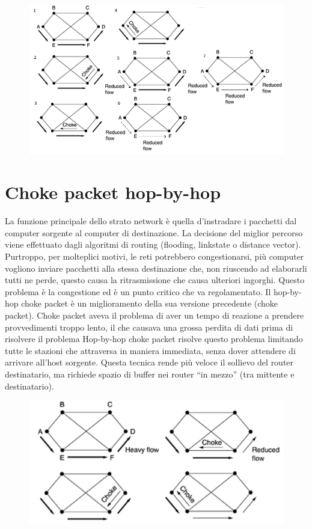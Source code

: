 \begin{figure}[H]
\centering
\includegraphics[scale=0.6]{res/img/35_ChokePacket.png}
\end{figure}

\section{Choke packet hop-by-hop}

La funzione principale dello strato network è quella d’instradare i pacchetti dal computer sorgente al computer di destinazione. La decisione del miglior percorso viene effettuato dagli algoritmi di routing (flooding, linkstate o distance vector). Purtroppo, per molteplici motivi, le reti potrebbero congestionarsi, più computer vogliono inviare pacchetti alla stessa destinazione che, non riuscendo ad elaborarli tutti ne perde, questo causa la ritrasmissione che causa ulteriori ingorghi. Questo problema è la congestione ed è un punto critico che va regolamentato.
Il hop-by-hop choke packet è un miglioramento della sua versione precedente (choke packet).
Choke packet aveva il problema di aver un tempo di reazione a prendere provvedimenti troppo lento, il che causava una grossa perdita di dati prima di risolvere il problema
Hop-by-hop choke packet risolve questo problema limitando tutte le stazioni che attraversa in maniera immediata, senza dover attendere di arrivare all’host sorgente.
Questa tecnica rende più veloce il sollievo del router destinatario, ma richiede spazio di buffer nei router “in mezzo” (tra mittente e destinatario).

\begin{figure}[H]
\centering
\includegraphics[scale=0.6]{res/img/36_ChokePacketHopbHop.png}
\end{figure}
 
